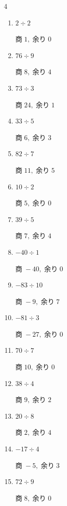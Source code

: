 \begin{multicols}{4}
\begin{enumerate}
  \item $2 \div 2$

        $商\; 1,\; 余り\; 0$

  \item $76 \div 9$

        $商\; 8,\; 余り\; 4$

  \item $73 \div 3$

        $商\; 24,\; 余り\; 1$

  \item $33 \div 5$

        $商\; 6,\; 余り\; 3$

  \item $82 \div 7$

        $商\; 11,\; 余り\; 5$

  \item $10 \div 2$

        $商\; 5,\; 余り\; 0$

  \item $39 \div 5$

        $商\; 7,\; 余り\; 4$

\columnbreak %

  \item $-40 \div 1$

        $商\; -40,\; 余り\; 0$

  \item $-83 \div 10$

        $商\; -9,\; 余り\; 7$

  \item $-81 \div 3$

        $商\; -27,\; 余り\; 0$

  \item $70 \div 7$

        $商\; 10,\; 余り\; 0$

  \item $38 \div 4$

        $商\; 9,\; 余り\; 2$

  \item $20 \div 8$

        $商\; 2,\; 余り\; 4$

  \item $-17 \div 4$

        $商\; -5,\; 余り\; 3$

  \item $72 \div 9$

        $商\; 8,\; 余り\; 0$


\end{enumerate}
\end{multicols}
